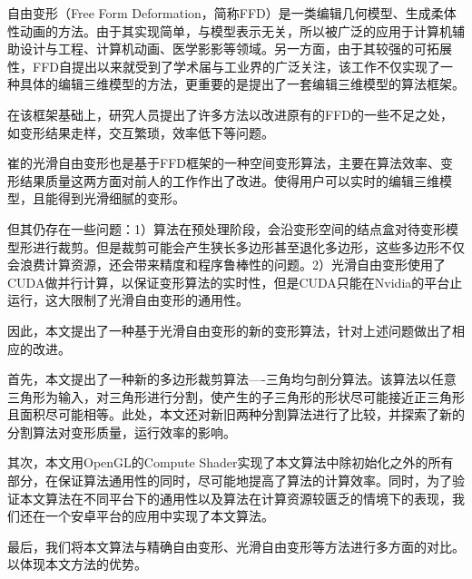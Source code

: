 
\begin{cabstract}
    自由变形\cite{Sederberg86}（Free Form Deformation，简称FFD）是一类编辑几何模型、生成柔体性动画的方法。由于其实现简单，与模型表示无关，所以被广泛的应用于计算机辅助设计与工程、计算机动画、医学影影等领域。另一方面，由于其较强的可拓展性，FFD\cite{Sederberg86}自提出以来就受到了学术届与工业界的广泛关注，该工作不仅实现了一种具体的编辑三维模型的方法，更重要的是提出了一套编辑三维模型的算法框架。

在该框架基础上，研究人员提出了许多方法以改进原有的FFD的一些不足之处，如变形结果走样，交互繁琐，效率低下等问题。

    崔的光滑自由变形\cite{Cui15}也是基于FFD框架的一种空间变形算法，主要在算法效率、变形结果质量这两方面对前人的工作作出了改进。使得用户可以实时的编辑三维模型，且能得到光滑细腻的变形。

    但其仍存在一些问题：1）算法在预处理阶段，会沿变形空间的结点盒对待变形模型形进行裁剪。但是裁剪可能会产生狭长多边形甚至退化多边形，这些多边形不仅会浪费计算资源，还会带来精度和程序鲁棒性的问题。2）光滑自由变形使用了CUDA做并行计算，以保证变形算法的实时性，但是CUDA只能在Nvidia的平台止运行，这大限制了光滑自由变形的通用性。

    因此，本文提出了一种基于光滑自由变形的新的变形算法，针对上述问题做出了相应的改进。

    首先，本文提出了一种新的多边形裁剪算法----三角均匀剖分算法。该算法以任意三角形为输入，对三角形进行分割，使产生的子三角形的形状尽可能接近正三角形且面积尽可能相等。此处，本文还对新旧两种分割算法进行了比较，并探索了新的分割算法对变形质量，运行效率的影响。

    其次，本文用OpenGL的Compute Shader实现了本文算法中除初始化之外的所有部分，在保证算法通用性的同时，尽可能地提高了算法的计算效率。同时，为了验证本文算法在不同平台下的通用性以及算法在计算资源较匮乏的情境下的表现，我们还在一个安卓平台的应用中实现了本文算法。

    最后，我们将本文算法与精确自由变形、光滑自由变形等方法进行多方面的对比。以体现本文方法的优势。
\end{cabstract}

